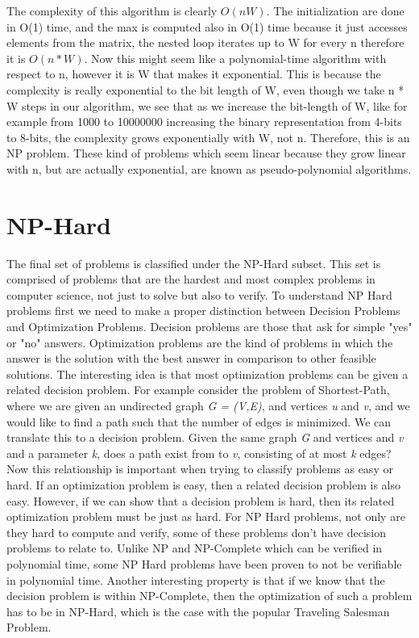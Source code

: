 \documentclass{article}
\begin{document}
    The complexity of this algorithm is clearly $O(nW)$. The initialization are done in O(1) time, and the max is computed also in O(1) time because it just accesses elements from the matrix, the nested loop iterates up to W for every n therefore it is $O(n * W)$. Now this might seem like a polynomial-time algorithm with respect to n, however it is W that makes it exponential. This is because the complexity is really exponential to the bit length of W, even though we take n * W steps in our algorithm, we see that as we increase the bit-length of W, like for example from 1000 to 10000000 increasing the binary representation from 4-bits to 8-bits, the complexity grows exponentially with W, not n. Therefore, this is an NP problem. These kind of problems which seem linear because they grow linear with n, but are actually exponential, are known as pseudo-polynomial algorithms\cite{knapsack}. 
    
    \section*{NP-Hard}
    The final set of problems is classified under the NP-Hard subset. This set is comprised of problems that are the hardest and most complex problems in computer science, not just to solve but also to verify. To understand NP Hard problems first we need to make a proper distinction between Decision Problems and Optimization Problems. Decision problems are those that ask for simple "yes" or "no" answers. Optimization problems are the kind of problems in which the answer is the solution with the best answer in comparison to other feasible solutions. The interesting idea is that most optimization problems can be given a related decision problem. For example consider the problem of Shortest-Path, where we are given an undirected graph \textit{G = (V,E)}, and vertices \textit{u} and \textit{v}, and we would like to find a path such that the number of edges is minimized. We can translate this to a decision problem. Given the same graph \textit{G} and vertices  and \textit{v} and a parameter \textit{k}, does a path exist from   to \textit{v}, consisting of at most \textit{k} edges? Now this relationship is important when trying to classify problems as easy or hard. If an optimization problem is easy, then a related decision problem is also easy. However, if we can show that a decision problem is hard, then its related optimization problem must be just as hard. For NP Hard problems, not only are they hard to compute and verify, some of these problems don't have decision problems to relate to. Unlike NP and NP-Complete which can be verified in polynomial time, some NP Hard problems have been proven to not be verifiable in polynomial time. Another interesting property is that if we know that the decision problem is within NP-Complete, then the optimization of such a problem has to be in NP-Hard, which is the case with the popular Traveling Salesman Problem\cite{clrs}. 
    
\end{document}
